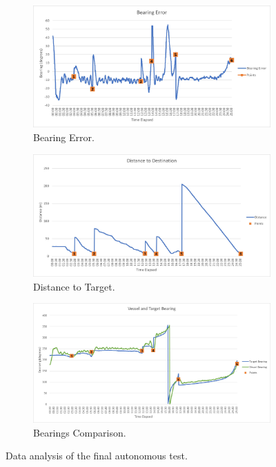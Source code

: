 \begin{figure}
	\begin{center}
		\begin{subfigure}{0.8\linewidth}
			\includegraphics[width = \linewidth]{figures/graphBearingError.jpg}
			\caption{Bearing Error.}
			\label{grph:4:BearingError}	
		\end{subfigure}
		\begin{subfigure}{0.8\linewidth}
			\includegraphics[width = \linewidth]{figures/graphDistance.jpg}
			\caption{Distance to Target.}
			\label{grph:4:distance}	
		\end{subfigure}
		\begin{subfigure}{0.8\linewidth}
			\includegraphics[width = \linewidth]{figures/graphBearings.jpg}
			\caption{Bearings Comparison.}
			\label{grph:4:2bearings}	
		\end{subfigure}
		\caption{Data analysis of the final autonomous test.}
		\label{fig:4:Results}
	\end{center}
\end{figure} 
